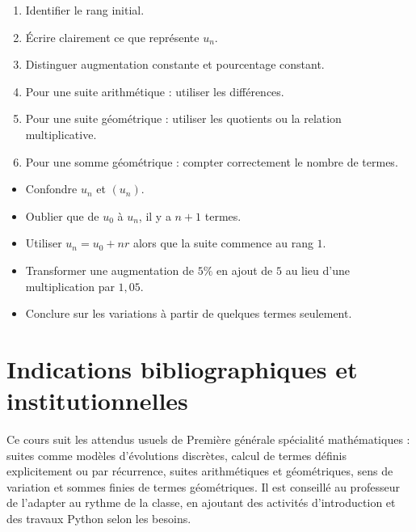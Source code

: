 \documentclass[11pt,a4paper]{article}
\begin{document}
\begin{methodbox}
\begin{enumerate}
  \item Identifier le rang initial.
  \item Écrire clairement ce que représente $u_n$.
  \item Distinguer augmentation constante et pourcentage constant.
  \item Pour une suite arithmétique : utiliser les différences.
  \item Pour une suite géométrique : utiliser les quotients ou la relation multiplicative.
  \item Pour une somme géométrique : compter correctement le nombre de termes.
\end{enumerate}
\end{methodbox}

\begin{warningbox}
\begin{itemize}
  \item Confondre $u_n$ et $(u_n)$.
  \item Oublier que de $u_0$ à $u_n$, il y a $n+1$ termes.
  \item Utiliser $u_n=u_0+nr$ alors que la suite commence au rang $1$.
  \item Transformer une augmentation de $5\%$ en ajout de $5$ au lieu d'une multiplication par $1{,}05$.
  \item Conclure sur les variations à partir de quelques termes seulement.
\end{itemize}
\end{warningbox}

\section*{Indications bibliographiques et institutionnelles}
Ce cours suit les attendus usuels de Première générale spécialité mathématiques : suites comme modèles d'évolutions discrètes, calcul de termes définis explicitement ou par récurrence, suites arithmétiques et géométriques, sens de variation et sommes finies de termes géométriques. Il est conseillé au professeur de l'adapter au rythme de la classe, en ajoutant des activités d'introduction et des travaux Python selon les besoins.
\end{document}
